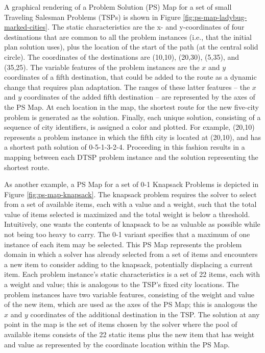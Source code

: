 A graphical rendering of a Problem Solution (PS) Map for a set of small Traveling Salesman Problems (TSPs) is shown in Figure \ref{fig:ps-map-ladybug-marked-cities}.  The static characteristics are the x- and y-coordinates of four destinations that are common to all the problem instances (i.e., that the initial plan solution uses), plus the location of the start of the path (at the central solid circle).  The coordinates of the destinations are (10,10), (20,30), (5,35), and (35,25). The variable features of the problem instances are the $x$ and $y$ coordinates of a fifth destination, that could be added to the route as a dynamic change that requires plan adaptation.  The ranges of these latter features -- the $x$ and $y$ coordinates of the added fifth destination -- are represented by the  axes of the PS Map.  At each location in the map, the shortest route for the new five-city problem is generated as the solution.  Finally, each unique solution, consisting of a sequence of city identifiers, is assigned a color and plotted.  For example, (20,10) represents a problem instance in which the fifth city is located at (20,10), and has a shortest path solution of 0-5-1-3-2-4.  Proceeding in this fashion results in a mapping between each DTSP problem instance and the solution representing the shortest route.

As another example, a PS Map for a set of 0-1 Knapsack Problems is depicted in Figure \ref{fig:ps-map-knapsack}.  The knapsack problem requires the solver to select from a set of available items, each with a value and a weight, such that the total value of items selected is maximized and the total weight is below a threshold.  Intuitively, one wants the contents of knapsack to be as valuable as possible while not being too heavy to carry.  The 0-1 variant specifies that a maximum of one instance of each item may be selected.  This PS Map represents the problem domain in which a solver has already selected from a set of items and encounters a new item to consider adding to the knapsack, potentially displacing a current item.  Each problem instance's static characteristics is a set of 22 items, each with a weight and value; this is analogous to the TSP's fixed city locations.  The problem instances have two variable features, consisting of the weight and value of the new item, which are used as the axes of the PS Map; this is analogous the $x$ and $y$ coordinates of the additional destination in the TSP.  The solution at any point in the map is the set of items chosen by the solver where the pool of available items consists of the 22 static items plus the new item that has weight and value as represented by the coordinate location within the PS Map.

